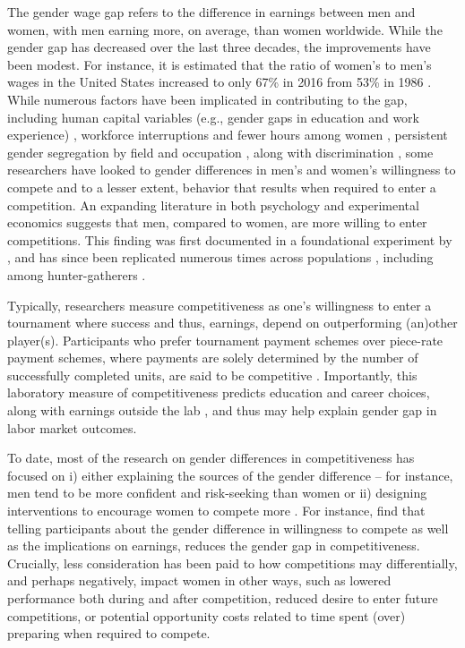 \documentclass[letterpaper, nobind]{templates/ociamthesis}
\begin{document}
The gender wage gap refers to the difference in earnings between men and women, with men earning more, on average, than women worldwide. While the gender gap has decreased over the last three decades, the improvements have been modest. For instance, it is estimated that the ratio of women's to men's wages in the United States increased to only 67\% in 2016 from 53\% in 1986 \autocite{Gharehgozli2020}. While numerous factors have been implicated in contributing to the gap, including human capital variables (e.g., gender gaps in education and work experience) \autocite{Goldin2006a}, workforce interruptions and fewer hours among women \autocite{Blau2017a}, persistent gender segregation by field and occupation \autocite{Blau2017,Goldin2014}, along with discrimination \autocite{Blau2017}, some researchers have looked to gender differences in men's and women's willingness to compete and to a lesser extent, behavior that results when required to enter a competition. An expanding literature in both psychology and experimental economics suggests that men, compared to women, are more willing to enter competitions. This finding was first documented in a foundational experiment by \textcite{Niederle2007}, and has since been replicated numerous times across populations \autocites[for reviews, see][]{Croson2009,Niederle2011,Niederle2017a}[and][]{Shurchkov2018}, including among hunter-gatherers \autocite{Apicella2015}.

Typically, researchers measure competitiveness as one's willingness to enter a tournament where success and thus, earnings, depend on outperforming (an)other player(s). Participants who prefer tournament payment schemes over piece-rate payment schemes, where payments are solely determined by the number of successfully completed units, are said to be competitive \autocite{Niederle2007}. Importantly, this laboratory measure of competitiveness predicts education and career choices, along with earnings outside the lab \autocite{Buser2014,Zhang2012,Buser2017c,Samek2019,Berge2015,Reuben2015,Reuben2017,Buser2017b,Buser2020a}, and thus may help explain gender gap in labor market outcomes.

To date, most of the research on gender differences in competitiveness has focused on i) either explaining the sources of the gender difference -- for instance, men tend to be more confident and risk-seeking than women \autocite[e.g.,][]{Veldhuizen2017} or ii) designing interventions to encourage women to compete more \autocite{Balafoutas2012,Sutter2016,Cassar2016,Brandts2015,Niederle2013,Brandts2015,Healy2011,Alan2018}. For instance, \textcite{Kessel2021} find that telling participants about the gender difference in willingness to compete as well as the implications on earnings, reduces the gender gap in competitiveness. Crucially, less consideration has been paid to how competitions may differentially, and perhaps negatively, impact women in other ways, such as lowered performance both during and after competition, reduced desire to enter future competitions, or potential opportunity costs related to time spent (over) preparing when required to compete.
\end{document}
